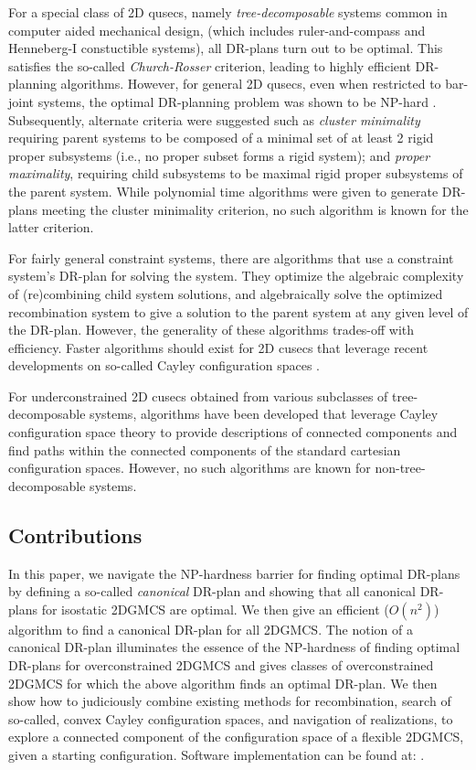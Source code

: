 For a special class of 2D qusecs, namely  {\em tree-decomposable} systems \cite{XX} common in computer aided mechanical design, 
(which includes ruler-and-compass and Henneberg-I constuctible systems), all DR-plans turn out to 
be optimal. This satisfies the so-called {\em Church-Rosser} criterion, leading to highly efficient DR-planning algorithms.
However, for general 2D qusecs, even when restricted to bar-joint systems, 
the optimal DR-planning problem was shown to be NP-hard \cite{XX}.
Subsequently, alternate criteria were suggested   
such as {\em cluster minimality} 
requiring parent systems to be composed of  
a minimal set of at least 2 rigid proper subsystems (i.e., no proper subset forms a rigid system); 
and {\em proper maximality}, requiring child subsystems
to be maximal rigid proper subsystems of the parent system.
While polynomial time algorithms were given \cite{XX} to generate DR-plans meeting the cluster minimality criterion,
no such algorithm is known for the latter criterion.

For fairly general constraint systems, there are algorithms that use a constraint system's DR-plan \cite{XX} for solving the system.
They optimize the algebraic complexity of (re)combining child system solutions, 
and algebraically solve the optimized recombination system to give a solution to the parent system at any
given level of the DR-plan. However, the generality of these algorithms trades-off with efficiency. 
Faster algorithms should exist for 2D cusecs that leverage recent developments on so-called Cayley configuration spaces
\cite{XX,XX}.

For underconstrained 2D cusecs obtained from various subclasses of tree-decomposable systems, algorithms have been developed \cite{XX} that 
leverage Cayley configuration space theory to provide descriptions of connected components and find paths within the connected components 
of the standard cartesian configuration spaces. However, no such algorithms are known for non-tree-decomposable systems.

 
  


\subsection{Contributions}
In this paper, we  navigate the NP-hardness barrier for finding optimal DR-plans by defining a 
so-called {\it canonical} DR-plan and showing that all canonical DR-plans for isostatic 2DGMCS are optimal. 
We then give an efficient ($O(n^2)$) algorithm to find a canonical DR-plan for all 2DGMCS. The notion of a canonical DR-plan 
illuminates the essence of the NP-hardness of finding optimal DR-plans for overconstrained 2DGMCS and gives classes of 
overconstrained 2DGMCS for which the above  algorithm finds an optimal DR-plan. We then show how to judiciously combine 
existing methods for recombination, search of so-called, convex Cayley configuration spaces, and navigation of realizations, 
to explore a connected component of the configuration space of a flexible 2DGMCS, given a starting configuration. 
Software implementation can be found at: .

